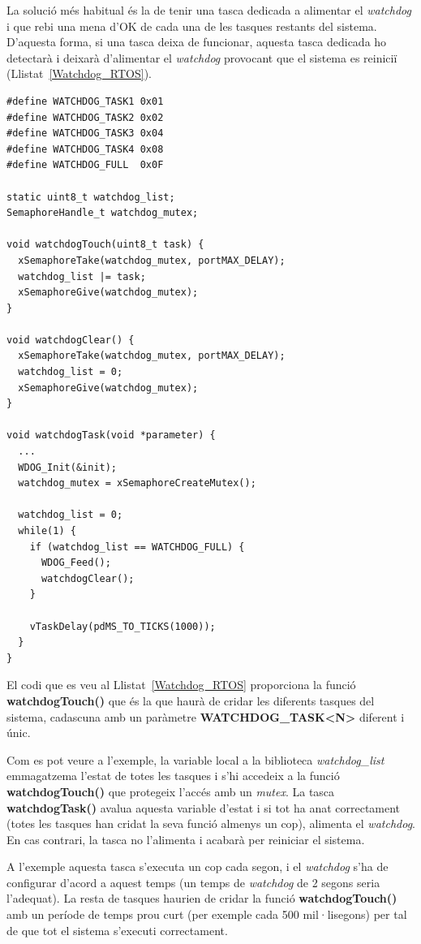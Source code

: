 La solució més habitual és la de tenir una tasca dedicada a alimentar el {\em watchdog} i que rebi una mena d'OK de cada una de les tasques restants del sistema. D'aquesta forma, si una tasca deixa de funcionar, aquesta tasca dedicada ho detectarà i deixarà d'alimentar el {\em watchdog} provocant que el sistema es reiniciï (Llistat~\ref{Watchdog_RTOS}).

\begin{lstlisting}[style=customc,caption={Codi d'exemple de la tasca de control del {\bf watchdog}},label=Watchdog_RTOS]
#define WATCHDOG_TASK1 0x01
#define WATCHDOG_TASK2 0x02
#define WATCHDOG_TASK3 0x04
#define WATCHDOG_TASK4 0x08
#define WATCHDOG_FULL  0x0F

static uint8_t watchdog_list;
SemaphoreHandle_t watchdog_mutex;

void watchdogTouch(uint8_t task) {
  xSemaphoreTake(watchdog_mutex, portMAX_DELAY);
  watchdog_list |= task;
  xSemaphoreGive(watchdog_mutex);
}

void watchdogClear() {
  xSemaphoreTake(watchdog_mutex, portMAX_DELAY);
  watchdog_list = 0;
  xSemaphoreGive(watchdog_mutex);
}

void watchdogTask(void *parameter) {
  ...
  WDOG_Init(&init);
  watchdog_mutex = xSemaphoreCreateMutex();

  watchdog_list = 0;
  while(1) {
    if (watchdog_list == WATCHDOG_FULL) {
      WDOG_Feed();
      watchdogClear();      
    } 

    vTaskDelay(pdMS_TO_TICKS(1000));
  }
}
\end{lstlisting}

El codi que es veu al Llistat~\ref{Watchdog_RTOS} proporciona la funció {\bf watchdogTouch()} que és la que haurà de cridar les diferents tasques del sistema, cadascuna amb un paràmetre {\bf WATCHDOG\_TASK<N>} diferent i únic.

Com es pot veure a l'exemple, la variable local a la biblioteca {\em watchdog\_list} emmagatzema l'estat de totes les tasques i s'hi accedeix a la funció {\bf watchdogTouch()} que protegeix l'accés amb un {\em mutex}. La tasca {\bf watchdogTask()} avalua aquesta variable d'estat i si tot ha anat correctament (totes les tasques han cridat la seva funció almenys un cop), alimenta el {\em watchdog}. En cas contrari, la tasca no l'alimenta i acabarà per reiniciar el sistema.

A l'exemple aquesta tasca s'executa un cop cada segon, i el {\em watchdog} s'ha de configurar d'acord a aquest temps (un temps de {\em watchdog} de 2 segons seria l'adequat). La resta de tasques haurien de cridar la funció {\bf watchdogTouch()} amb un període de temps prou curt (per exemple cada 500 mil·lisegons) per tal de que tot el sistema s'executi correctament.
